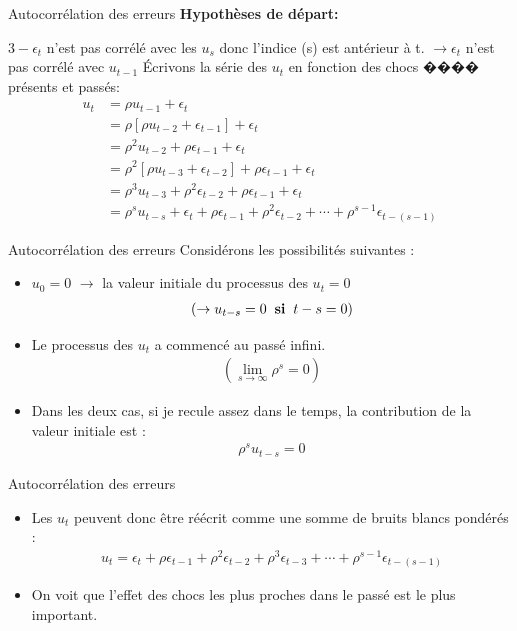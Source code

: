 \documentclass{beamer}
\begin{document}
\begin{frame}{Autocorrélation des erreurs}
\textbf{Hypothèses de départ:}
\begin{block}{$3-\epsilon_t$ n'est pas corrélé avec les $u_s$ donc l'indice (s) est antérieur à t. $\rightarrow \epsilon_t$ n'est pas corrélé avec $u_{t-1}$}
Écrivons la série des $u_t$ en fonction des chocs ���� présents et passés:
\begin{align*}
u_t & =\rho u_{t-1}+\epsilon_t \\ & = \rho [\rho u_{t-2}+\epsilon_{t-1}]+\epsilon_t \\ & = \rho^2 u_{t-2}+\rho \epsilon_{t-1}+\epsilon_t \\ & = \rho^2[\rho u_{t-3}+\epsilon_{t-2}]+\rho \epsilon_{t-1}+\epsilon_t \\ & = \rho^3 u_{t-3}+\rho^2 \epsilon_{t-2}+\rho \epsilon_{t-1}+\epsilon_t \\ & = \rho^su_{t-s}+\epsilon_t+\rho \epsilon_{t-1}+\rho^2 \epsilon_{t-2}+\cdots + \rho^{s-1}\epsilon_{t-(s-1)}
\end{align*}
\end{block}
\end{frame}

\begin{frame}{Autocorrélation des erreurs}
Considérons les possibilités suivantes :
\begin{itemize}
\item $u_0=0$ $\rightarrow$ la valeur initiale du processus des $u_t=0$ 
\begin{align*}
(\rightarrow u_{t-s}=0 \hspace{0.2cm} \textbf{si} \hspace{0.2cm} t-s=0)
\end{align*}
\item Le processus des $u_t$ a commencé au passé infini.
\begin{align*}
(\lim_{s \rightarrow \infty} \rho^s=0)
\end{align*}
\item Dans les deux cas, si je recule assez dans le temps, la contribution de la valeur initiale est :
\begin{align*}
\rho^s u_{t-s}=0
\end{align*}
\end{itemize}
\end{frame}


\begin{frame}{Autocorrélation des erreurs}
\begin{itemize}
\item Les $u_t$ peuvent donc être réécrit comme une somme de bruits blancs pondérés :
\begin{align*}
u_t = \epsilon_t+\rho \epsilon_{t-1} + \rho^2 \epsilon_{t-2} + \rho^3 \epsilon_{t-3}+\cdots+\rho^{s-1}\epsilon_{t-(s-1)}
\end{align*}
\item On voit que l’effet des chocs les plus proches dans le passé est le plus important.
\end{itemize}
\end{frame}
\end{document}
